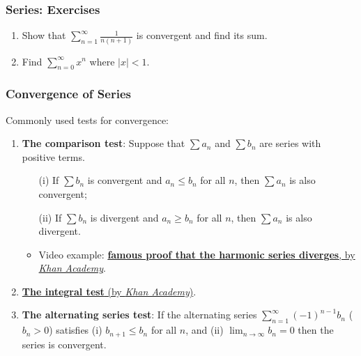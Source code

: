 \documentclass{beamer}
\begin{document}
\begin{frame}
\frametitle{Series: Exercises}
\begin{enumerate}
\item Show that $\sum_{n=1}^{\infty} \frac{1}{n(n+1)}$ is convergent and find its sum.
\vspace*{1.2in}
\item Find $\sum_{n=0}^{\infty} x^n$ where $\vert x \vert < 1$.
\vspace*{1.2in}
\end{enumerate}
\end{frame}

\begin{frame}
\frametitle{Convergence of Series}
Commonly used tests for convergence:
\begin{enumerate}
\item \textbf{The comparison test}: Suppose that $\sum a_n$ and $\sum b_n$ are series with positive terms. 
\begin{itemize}
\item[(i)] If $\sum b_n$ is convergent and $a_n \leq b_n$ for all $n$, then $\sum a_n$ is also convergent;
\item[(ii)] If $\sum b_n$ is divergent and $a_n \geq b_n$ for all $n$, then $\sum a_n$ is also divergent.
\item Video example: \href{https://youtu.be/4yyLfrsSXQQ}{\textbf{famous proof that the harmonic series diverges}, by \textit{Khan Academy}}.
\end{itemize}
\item \href{https://youtu.be/xRyXz_UZ14Q}{\textbf{The integral test} (by \textit{Khan Academy})}.
\item \textbf{The alternating series test}: If the alternating series $\sum_{n=1}^{\infty} (-1)^{n-1} b_n$ ($b_n > 0$) satisfies (i) $b_{n+1} \leq b_n$ for all $n$, and (ii) $\lim_{n \rightarrow \infty} b_n = 0$ then the series is convergent.
\end{enumerate}
\end{frame}
\end{document}
